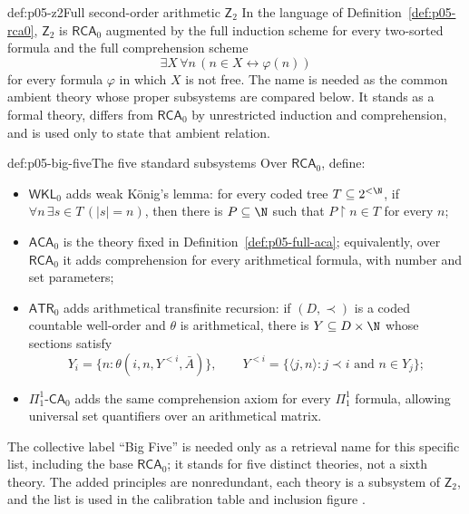 \begin{hbdefinition}{def:p05-z2}{Full second-order arithmetic \(\mathsf Z_2\)}
In the language of Definition~\ref{def:p05-rca0}, \(\mathsf Z_2\) is
\(\mathsf{RCA}_0\) augmented by the full induction scheme for every
two-sorted formula and the full comprehension scheme
\[
 \exists X\,\forall n\,(n\in X\leftrightarrow\varphi(n))
\]
for every formula \(\varphi\) in which \(X\) is not free.  The name is needed
as the common ambient theory whose proper subsystems are compared below.  It
stands as a formal theory, differs from \(\mathsf{RCA}_0\) by unrestricted
induction and comprehension, and is used only to state that ambient relation.
\end{hbdefinition}

\begin{hbdefinition}{def:p05-big-five}{The five standard subsystems}
Over \(\mathsf{RCA}_0\), define:
\begin{itemize}
  \item \(\mathsf{WKL}_0\) adds weak K\"onig's lemma: for every coded tree
        \(T\subseteq2^{<\N}\), if
        \(\forall n\,\exists s\in T\,(|s|=n)\), then there is
        \(P\subseteq\N\) such that \(P\upharpoonright n\in T\) for every
        \(n\);
  \item \(\mathsf{ACA}_0\) is the theory fixed in
        Definition~\ref{def:p05-full-aca}; equivalently, over
        \(\mathsf{RCA}_0\) it adds comprehension for every arithmetical
        formula, with number and set parameters;
  \item \(\mathsf{ATR}_0\) adds arithmetical transfinite recursion: if
        \((D,\prec)\) is a coded countable well-order and \(\theta\) is
        arithmetical, there is \(Y\subseteq D\times\N\) whose sections satisfy
        \[
          Y_i=\{n:\theta(i,n,Y^{<i},\bar A)\},
          \qquad
          Y^{<i}=\{\langle j,n\rangle:j\prec i
                         \text{ and }n\in Y_j\};
        \]
  \item \(\Pi^1_1\text{-}\mathsf{CA}_0\) adds the same comprehension axiom
        for every \(\Pi^1_1\) formula, allowing universal set quantifiers over
        an arithmetical matrix.
\end{itemize}
The collective label “Big Five” is needed only as a retrieval name for this
specific list, including the base \(\mathsf{RCA}_0\); it stands for five
distinct theories, not a sixth theory.  The added principles are
nonredundant, each theory is a subsystem of \(\mathsf Z_2\), and the list is
used in the calibration table and inclusion figure \cite{Simpson2009}.
\end{hbdefinition}

